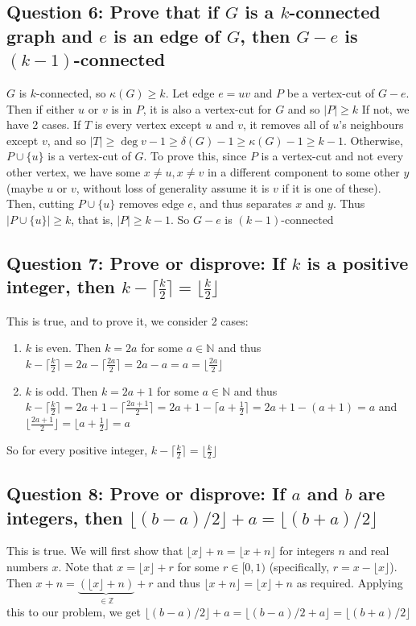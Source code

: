 \documentclass[letterpaper, 11pt]{article}
\newcommand{\1}{\mathds{1}}	%
\theoremstyle{definition}
\begin{document}
\subsection*{Question 6: Prove that if $G$ is a $k$-connected graph and $e$ is an edge of $G$, then $G-e$ is $(k-1)$-connected}
$G$ is $k$-connected, so $\kappa (G) \ge k$. Let edge $e = uv$ and $P$ be a vertex-cut of $G-e$. Then if either $u$ or $v$ is in $P$, it is also a vertex-cut for $G$ and so $|P| \ge k$ If not, we have 2 cases. If $T$ is every vertex except $u$ and $v$, it removes all of $u$'s neighbours except $v$, and so $|T| \ge \deg v - 1 \ge \delta (G) - 1\ge \kappa (G) - 1 \ge k-1 $. Otherwise, $P \cup \{u\}$ is a vertex-cut of $G$. To prove this, since $P$ is a vertex-cut and not every other vertex, we have some $x \ne u, x \ne v$ in a different component to some other $y$ (maybe $u$ or $v$, without loss of generality assume it is $v$ if it is one of these). Then, cutting $P \cup \{u\}$ removes edge $e$, and thus separates $x$ and $y$. Thus $|P \cup \{u\}| \ge k$, that is, $|P| \ge k-1$. So $G-e$ is $(k-1)$-connected

 \subsection*{Question 7: Prove or disprove: If $k$ is a positive integer, then $k - \lceil \frac{k}{2} \rceil= \lfloor \frac{k}{2}\rfloor$}             
 This is true, and to prove it, we consider 2 cases:
 \begin{enumerate}
 \item $k$ is even. Then $k = 2a$ for some $a \in \mathbb{N}$ and thus $k - \lceil \frac{k}{2} \rceil = 2a - \lceil \frac{2a}{2} \rceil = 2a-a = a = \lfloor \frac{2a}{2}\rfloor$
 \item $k$ is odd. Then $k = 2a + 1$ for some $a \in \mathbb{N}$ and thus $k - \lceil \frac{k}{2} \rceil = 2a + 1 - \lceil \frac{2a+1}{2} \rceil = 2a + 1 - \lceil a + \frac{1}{2} \rceil = 2a+1-(a+1) = a$ and $\lfloor \frac{2a+1}{2}\rfloor  = \lfloor a+ \frac{1}{2}\rfloor  = a$ 
 \end{enumerate}
 So for every positive integer, $k - \lceil \frac{k}{2} \rceil= \lfloor \frac{k}{2}\rfloor$

\subsection*{Question 8: Prove or disprove: If $a$ and $b$ are integers, then $\lfloor (b-a)/2 \rfloor + a = \lfloor (b+a)/2 \rfloor $ }             
This is true.  We will first show that $\lfloor x \rfloor + n = \lfloor x+n \rfloor$ for integers $n$ and real numbers $x$. Note that $x = \lfloor x \rfloor + r$ for some $r \in [0,1)$ (specifically, $r = x - \lfloor x \rfloor$). Then $x+n = \underbrace{(\lfloor x \rfloor + n)}_{\in \mathbb{Z}} + r$ and thus $\lfloor x +n \rfloor = \lfloor x \rfloor + n$ as required. Applying this to our problem, we get $\lfloor (b-a)/2 \rfloor + a = \lfloor (b-a)/2 + a \rfloor = \lfloor (b+a)/2 \rfloor $
\end{document}
